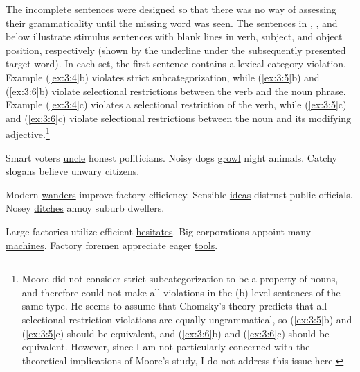  The incomplete sentences were designed so that there was no way of assessing their grammaticality until the missing word was seen. The sentences in , , and  below illustrate stimulus sentences with blank lines in verb, subject, and object position, respectively (shown by the underline under the subsequently presented target word). In each set, the first sentence contains a lexical category violation. Example (\ref{ex:3:4}b) violates strict subcategorization, while (\ref{ex:3:5}b) and (\ref{ex:3:6}b) violate selectional restrictions between the verb and the noun phrase. Example (\ref{ex:3:4}c) violates a selectional restriction of the verb, while (\ref{ex:3:5}c) and (\ref{ex:3:6}c) violate selectional restrictions between the noun and its modifying adjective.\footnote{Moore did not consider strict subcategorization to be a property of nouns, and therefore could not make all violations in the (b)-level sentences of the same type. He seems to assume that Chomsky's theory predicts that all selectional restriction violations are equally ungrammatical, so (\ref{ex:3:5}b) and (\ref{ex:3:5}c) should be equivalent, and (\ref{ex:3:6}b) and (\ref{ex:3:6}c) should be equivalent. However, since I am not particularly concerned with the theoretical implications of Moore's study, I do not address this issue here.
}


\ea\label{ex:3:4}
\ea Smart voters \uline{uncle} honest politicians.
\ex Noisy dogs \uline{growl} night animals.
\ex Catchy slogans \uline{believe} unwary citizens.
\z
\z


\ea\label{ex:3:5}
\ea Modern \uline{wanders} improve factory efficiency.
\ex Sensible \uline{ideas} distrust public officials.
\ex Nosey \uline{ditches} annoy suburb dwellers.
\z
\z


\ea\label{ex:3:6}
\ea Large factories utilize efficient \uline{hesitates}. 
\ex Big corporations appoint many \uline{machines}.
\ex Factory foremen appreciate eager \uline{tools}. \citep[553]{Moore1972}
\z
\z


